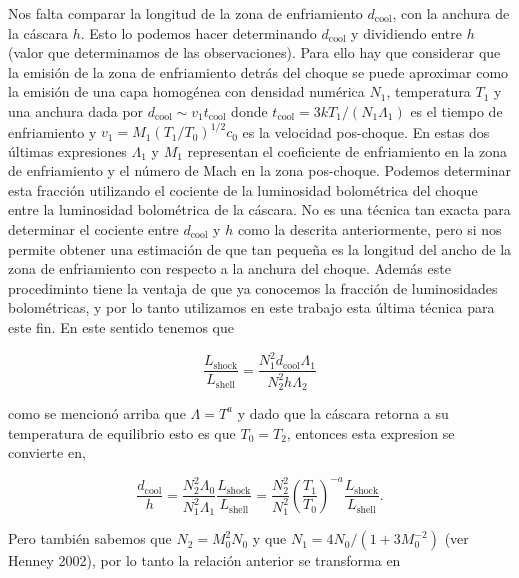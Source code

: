 Nos falta comparar la longitud de la zona de enfriamiento \(d_{\text{cool}}\), con la anchura de la cáscara \(h\). Esto lo podemos hacer determinando \(d_{\text{cool}}\) y dividiendo entre \(h\) (valor que determinamos de las observaciones). Para ello hay que considerar que la emisión de la zona de enfriamiento detrás del choque se puede aproximar como la emisión de una capa homogénea con densidad numérica \(N_{1}\), temperatura \(T_{1}\) y una anchura dada por \(d_{\text{cool}} \sim v_{1}t_{\text{cool}}\) donde \(t_{\text{cool}} = 3kT_{1}/(N_{1}\Lambda_{1})\) es el tiempo de enfriamiento y \(v_{1} = M_{1}(T_{1}/T_{0})^{1/2}c_{0}\) es la velocidad pos-choque. En estas dos últimas expresiones \(\Lambda_{1}\) y \(M_{1}\) representan el coeficiente de enfriamiento en la zona de enfriamiento y el número de Mach en la zona pos-choque. Podemos determinar esta fracción utilizando el cociente de la luminosidad bolométrica del choque entre la luminosidad bolométrica de la cáscara. No es una técnica tan exacta para determinar el cociente entre  \(d_{\text{cool}}\) y \(h\) como la descrita anteriormente, pero si nos permite obtener una estimación de que tan pequeña es la longitud del ancho de la zona de enfriamiento con respecto a la anchura del choque. Además este procediminto tiene la ventaja de que ya conocemos la fracción de luminosidades bolométricas, y por lo tanto utilizamos en este trabajo esta última técnica para este fin. En este sentido tenemos que 

\begin{equation}
  \label{eq:lumi-long}
  \frac{L_{\text{shock}}}{L_{\text{shell}}} = \frac{N^{2}_{1}d_{\text{cool}}\Lambda_{1}}{N^{2}_{2}h\Lambda_{2}}
\end{equation}

como se mencionó arriba que \(\Lambda = T^{a}\) y dado que la cáscara retorna a su temperatura de equilibrio esto es que \(T_{0} = T_{2}\), entonces esta expresion se convierte en,

\begin{equation*}
 \frac{d_{\text{cool}}}{h} = \frac{N^{2}_{2}\Lambda_{0}}{N^{2}_{1}\Lambda_{1}} \frac{L_{\text{shock}}}{L_{\text{shell}}} = \frac{N^{2}_{2}}{N^{2}_{1}}\left(\frac{T_{1}}{T_{0}}\right)^{-a} \frac{L_{\text{shock}}}{L_{\text{shell}}}.
\end{equation*}

Pero también sabemos que \(N_{2}=M^{2}_{0}N_{0}\) y que \(N_{1} = 4N_{0}/(1+3M_{0}^{-2})\) (ver Henney 2002), por lo tanto la relación anterior se transforma en  

